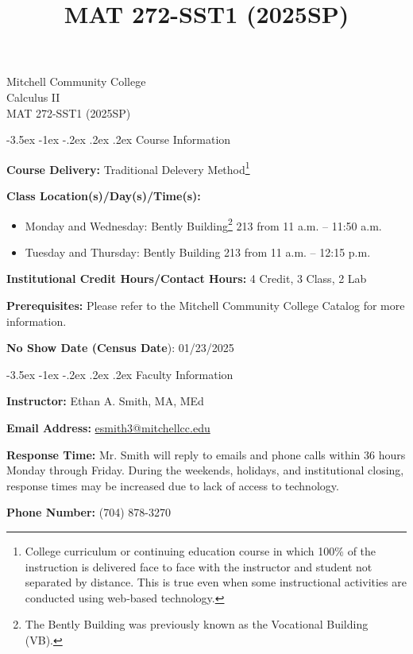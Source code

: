 \documentclass[11pt]{article}
\title{MAT 272-SST1 (2025SP)}
\makeatletter
\renewcommand\section{\@startsection{section}{1}{0pt}%
  {-3.5ex \@plus -1ex \@minus -.2ex}%
  {.2ex \@plus.2ex}%
  {\normalfont\Large\bfseries}} %
\makeatother
\begin{document}
\begin{center}
    {\huge Mitchell Community College} \\[6pt]
    {\Large Calculus II} \\[6pt]
    {\Large MAT 272-SST1 (2025SP)}
\end{center}

\section{Course Information}

\textbf{Course Delivery:} Traditional Delevery Method\footnote{College curriculum or continuing education course in which 100\% of the instruction is delivered face to face with the instructor and student not  separated by distance. This is true even when some instructional activities are conducted using web‐based technology.}

\textbf{Class Location(s)/Day(s)/Time(s):}

\begin{itemize}
\item Monday and Wednesday: Bently Building\footnote{The Bently Building was previously known as the Vocational Building (VB).} 213 from 11 a.m. -- 11:50 a.m.
\item Tuesday and Thursday: Bently Building 213 from 11 a.m. -- 12:15 p.m.
\end{itemize}

\textbf{Institutional Credit Hours/Contact Hours:} 4 Credit, 3 Class, 2 Lab

\textbf{Prerequisites:} Please refer to the Mitchell Community College Catalog for more information.

\textbf{No Show Date (Census Date}): 01/23/2025

\section{Faculty Information}

\textbf{Instructor:} Ethan A. Smith, MA, MEd

\textbf{Email Address:} \href{mailto:esmith3@mitchellcc.edu}{esmith3@mitchellcc.edu}

\textbf{Response Time:} Mr. Smith will reply to emails and phone calls within 36 hours Monday through Friday. During the weekends, holidays, and institutional closing, response times may be increased due to lack of access to technology.

\textbf{Phone Number:} (704) 878-3270
\end{document}
